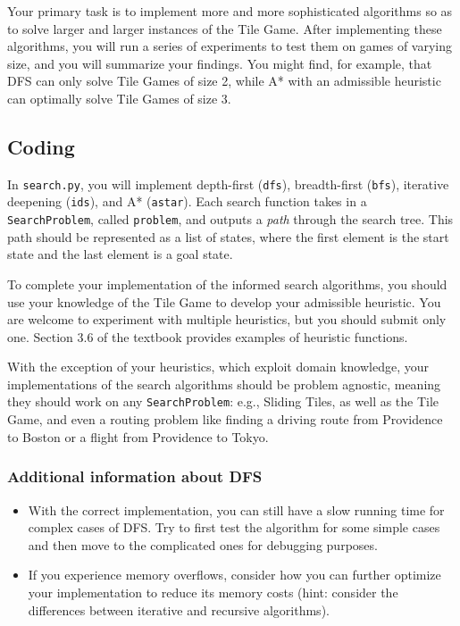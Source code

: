 \documentclass{article}
\begin{document}
Your primary task is to implement more and more sophisticated algorithms so as
to solve larger and larger instances of the Tile Game. After implementing these
algorithms, you will run a series of experiments to test them on games of
varying size, and you will summarize your findings. You might find, for
example, that DFS can only solve Tile Games of size 2, while A* with an
admissible heuristic can optimally solve Tile Games of size 3.


\subsection{Coding}

In \verb|search.py|, you will implement depth-first (\verb|dfs|), breadth-first
(\verb|bfs|), iterative deepening (\verb|ids|), and A* (\verb|astar|). Each
search function takes in a \verb|SearchProblem|, called \verb|problem|, and
outputs a \textit{path\/} through the search tree. This path should be
represented as a list of states, where the first element is the start state and
the last element is a goal state.

To complete your implementation of the informed search algorithms,
you should use your knowledge of the Tile Game to develop your
admissible heuristic.
You are welcome to experiment with multiple heuristics,
but you should submit only one. Section 3.6 of the textbook provides examples
of heuristic functions.

With the exception of your heuristics, which exploit domain knowledge,
your implementations of the search algorithms should be problem agnostic,
meaning they should work on any \verb|SearchProblem|:
e.g., Sliding Tiles, as well as the Tile Game,
and even a routing problem like finding a driving route from Providence
to Boston or a flight from Providence to Tokyo.

\subsubsection{Additional information about DFS}

\begin{itemize}
\item With the correct implementation, you can still have a slow running time
    for complex cases of DFS. Try to first test the algorithm for some simple
    cases and then move to the complicated ones for debugging purposes.
\item If you experience memory overflows, consider how you can further optimize
    your implementation to reduce its memory costs (hint: consider the
    differences between iterative and recursive algorithms).
\end{itemize}
\end{document}
